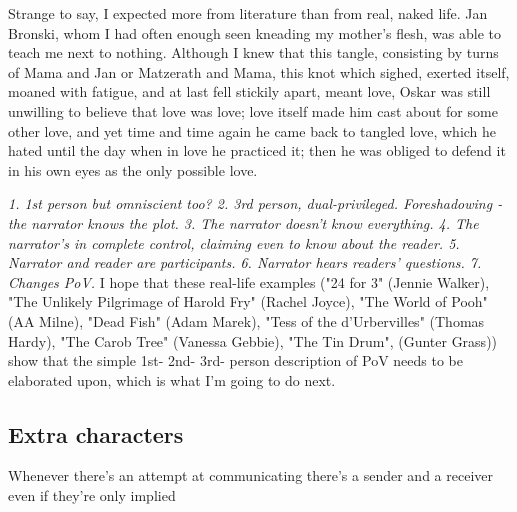 \documentclass[11pt]{article}
\newenvironment{narrow}[2]{%
 \begin{list}{}{%
  \setlength{\topsep}{0pt}%
  \setlength{\leftmargin}{#1}%
  \setlength{\rightmargin}{#2}%
  \setlength{\listparindent}{\parindent}%
  \setlength{\itemindent}{\parindent}%
  \setlength{\parsep}{\parskip}%
 }%
\item[]}{\end{list}}
\begin{document}
\begin{enumerate}
\item 
\begin{narrow}{1.0cm}{1.0cm}
Strange to say, I expected more from literature than from real, naked
 life. Jan Bronski, whom I had often enough seen kneading my mother's
 flesh, was able to teach me next to nothing. Although I knew that
 this tangle, consisting by turns of Mama and Jan or Matzerath and
 Mama, this knot which sighed, exerted itself, moaned with fatigue,
 and at last fell stickily apart, meant love, Oskar was still
 unwilling to believe that love was love; love itself made him cast
 about for some other love, and yet time and time again he came back
 to tangled love, which he hated until the day when in love he
 practiced it; then he was obliged to defend it in his own eyes as the
 only possible love.
\end{narrow}
\end{enumerate}

\textit{1. 1st person but omniscient too? 2. 3rd person, dual-privileged. Foreshadowing - the narrator knows the plot. 3. The narrator doesn't know everything. 4. The narrator's in complete control, claiming even to know about the reader. 5. Narrator and reader are participants. 6. Narrator hears readers' questions. 7. Changes PoV.}
I hope that these real-life examples ("24 for 3" (Jennie Walker),
"The Unlikely Pilgrimage of Harold Fry" (Rachel Joyce),
"The World of Pooh" (AA Milne),
"Dead Fish" (Adam Marek),
"Tess of the d'Urbervilles" (Thomas Hardy),
"The Carob Tree" (Vanessa Gebbie),
"The Tin Drum", (Gunter Grass)) show that the simple 1st- 2nd- 3rd- person description of PoV needs to be elaborated upon, which is what I'm going to do next.



\subsection*{Extra characters}
Whenever there's an attempt at communicating there's a sender and a receiver even if they're only implied
\end{document}
